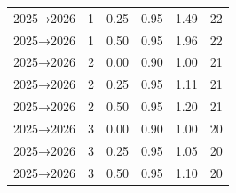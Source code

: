 \begin{table}[htbp]
\begin{tabular}{lrrrrr}
2025→2026 & 1 & 0.25 & 0.95 & 1.49 & 22 \\
2025→2026 & 1 & 0.50 & 0.95 & 1.96 & 22 \\
2025→2026 & 2 & 0.00 & 0.90 & 1.00 & 21 \\
2025→2026 & 2 & 0.25 & 0.95 & 1.11 & 21 \\
2025→2026 & 2 & 0.50 & 0.95 & 1.20 & 21 \\
2025→2026 & 3 & 0.00 & 0.90 & 1.00 & 20 \\
2025→2026 & 3 & 0.25 & 0.95 & 1.05 & 20 \\
2025→2026 & 3 & 0.50 & 0.95 & 1.10 & 20 \\
\bottomrule
\end{tabular}
\end{table}
